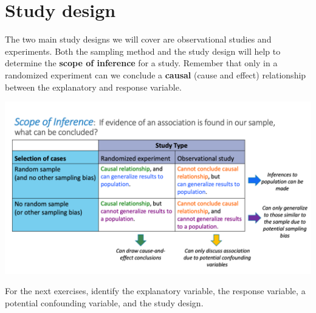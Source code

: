 \documentclass[
]{report}
\begin{document}
\newpage

\hypertarget{study-design-1}{%
\section{Study design}\label{study-design-1}}

The two main study designs we will cover are observational studies and experiments. Both the sampling method and the study design will help to determine the \textbf{scope of inference} for a study. Remember that only in a randomized experiment can we conclude a \textbf{causal} (cause and effect) relationship between the explanatory and response variable.

\begin{center}\includegraphics[width=0.75\linewidth]{images/ScopeOfInference} \end{center}

For the next exercises, identify the explanatory variable, the response variable, a potential confounding variable, and the study design.
\end{document}
